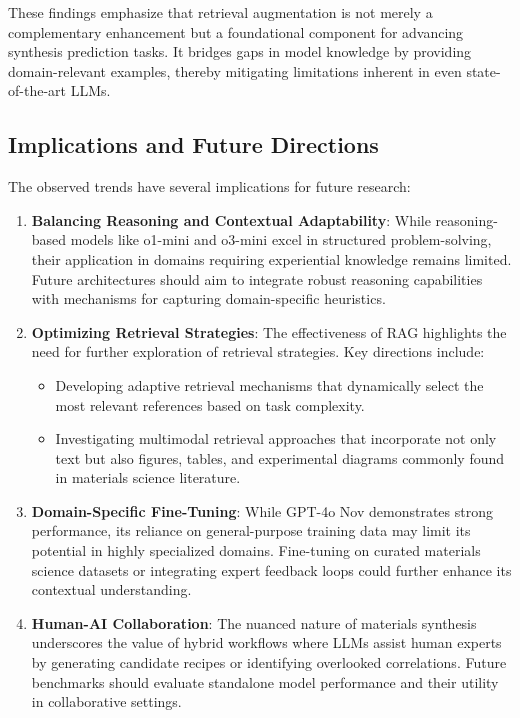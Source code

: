 These findings emphasize that retrieval augmentation is not merely a complementary enhancement but a foundational component for advancing synthesis prediction tasks. It bridges gaps in model knowledge by providing domain-relevant examples, thereby mitigating limitations inherent in even state-of-the-art LLMs.

\subsection{Implications and Future Directions}
The observed trends have several implications for future research:
\begin{enumerate}
    \item \textbf{Balancing Reasoning and Contextual Adaptability}: While reasoning-based models like o1-mini and o3-mini excel in structured problem-solving, their application in domains requiring experiential knowledge remains limited. Future architectures should aim to integrate robust reasoning capabilities with mechanisms for capturing domain-specific heuristics.
    
    \item \textbf{Optimizing Retrieval Strategies}: The effectiveness of RAG highlights the need for further exploration of retrieval strategies. Key directions include:
        \begin{itemize}
            \item Developing adaptive retrieval mechanisms that dynamically select the most relevant references based on task complexity.
            \item Investigating multimodal retrieval approaches that incorporate not only text but also figures, tables, and experimental diagrams commonly found in materials science literature.
        \end{itemize}
    
    \item \textbf{Domain-Specific Fine-Tuning}: While GPT-4o Nov demonstrates strong performance, its reliance on general-purpose training data may limit its potential in highly specialized domains. Fine-tuning on curated materials science datasets or integrating expert feedback loops could further enhance its contextual understanding.

    \item \textbf{Human-AI Collaboration}: The nuanced nature of materials synthesis underscores the value of hybrid workflows where LLMs assist human experts by generating candidate recipes or identifying overlooked correlations. Future benchmarks should evaluate standalone model performance and their utility in collaborative settings.
\end{enumerate}

